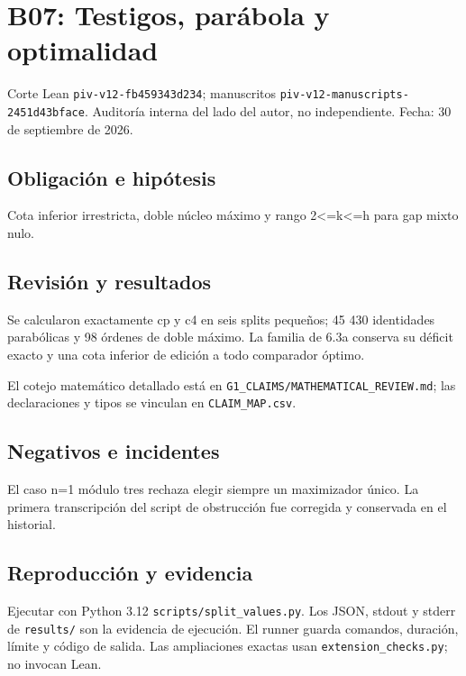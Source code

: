 \documentclass[11pt]{article}
\begin{document}
\section{B07: Testigos, parábola y
optimalidad}\label{b07-testigos-paruxe1bola-y-optimalidad}

Corte Lean \nolinkurl{piv-v12-fb459343d234}; manuscritos
\nolinkurl{piv-v12-manuscripts-2451d43bface}. Auditoría interna del lado
del autor, no independiente. Fecha: 30 de septiembre de 2026.

\subsection{Obligación e hipótesis}\label{obligaciuxf3n-e-hipuxf3tesis}

Cota inferior irrestricta, doble núcleo máximo y rango
2\textless=k\textless=h para gap mixto nulo.

\subsection{Revisión y resultados}\label{revisiuxf3n-y-resultados}

Se calcularon exactamente cp y c4 en seis splits pequeños; 45 430
identidades parabólicas y 98 órdenes de doble máximo. La familia de 6.3a
conserva su déficit exacto y una cota inferior de edición a todo
comparador óptimo.

El cotejo matemático detallado está en
\nolinkurl{G1_CLAIMS/MATHEMATICAL_REVIEW.md}; las declaraciones y tipos
se vinculan en \nolinkurl{CLAIM_MAP.csv}.

\subsection{Negativos e incidentes}\label{negativos-e-incidentes}

El caso n=1 módulo tres rechaza elegir siempre un maximizador único. La
primera transcripción del script de obstrucción fue corregida y
conservada en el historial.

\subsection{Reproducción y evidencia}\label{reproducciuxf3n-y-evidencia}

Ejecutar con Python 3.12 \nolinkurl{scripts/split_values.py}. Los JSON,
stdout y stderr de \nolinkurl{results/} son la evidencia de ejecución. El
runner guarda comandos, duración, límite y código de salida. Las
ampliaciones exactas usan \nolinkurl{extension_checks.py}; no invocan
Lean.
\end{document}
